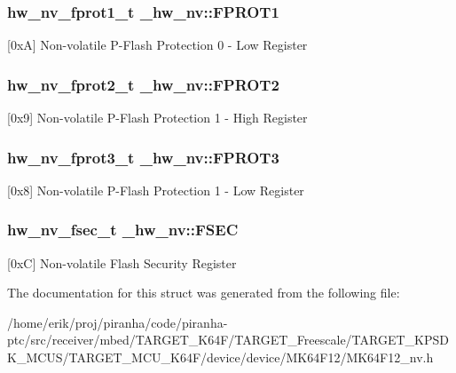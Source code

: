 \subsubsection[{\texorpdfstring{F\+P\+R\+O\+T1}{FPROT1}}]{ {\bf hw\+\_\+nv\+\_\+fprot1\+\_\+t} \+\_\+hw\+\_\+nv\+::\+F\+P\+R\+O\+T1}\hypertarget{struct__hw__nv_a3680dcb78d98d5d3177feafd381081c6}{}\label{struct__hw__nv_a3680dcb78d98d5d3177feafd381081c6}
\mbox{[}0xA\mbox{]} Non-\/volatile P-\/\+Flash Protection 0 -\/ Low Register 
\subsubsection[{\texorpdfstring{F\+P\+R\+O\+T2}{FPROT2}}]{ {\bf hw\+\_\+nv\+\_\+fprot2\+\_\+t} \+\_\+hw\+\_\+nv\+::\+F\+P\+R\+O\+T2}\hypertarget{struct__hw__nv_ad21a9c16923e734ef0df3bc50db9f8f2}{}\label{struct__hw__nv_ad21a9c16923e734ef0df3bc50db9f8f2}
\mbox{[}0x9\mbox{]} Non-\/volatile P-\/\+Flash Protection 1 -\/ High Register 
\subsubsection[{\texorpdfstring{F\+P\+R\+O\+T3}{FPROT3}}]{ {\bf hw\+\_\+nv\+\_\+fprot3\+\_\+t} \+\_\+hw\+\_\+nv\+::\+F\+P\+R\+O\+T3}\hypertarget{struct__hw__nv_aac4b392614cf656aa6df868cfb145360}{}\label{struct__hw__nv_aac4b392614cf656aa6df868cfb145360}
\mbox{[}0x8\mbox{]} Non-\/volatile P-\/\+Flash Protection 1 -\/ Low Register 
\subsubsection[{\texorpdfstring{F\+S\+EC}{FSEC}}]{ {\bf hw\+\_\+nv\+\_\+fsec\+\_\+t} \+\_\+hw\+\_\+nv\+::\+F\+S\+EC}\hypertarget{struct__hw__nv_a25e028222bc59182b5c0d1e035cf9e86}{}\label{struct__hw__nv_a25e028222bc59182b5c0d1e035cf9e86}
\mbox{[}0xC\mbox{]} Non-\/volatile Flash Security Register 

The documentation for this struct was generated from the following file\+:\begin{DoxyCompactItemize}
\item 
/home/erik/proj/piranha/code/piranha-\/ptc/src/receiver/mbed/\+T\+A\+R\+G\+E\+T\+\_\+\+K64\+F/\+T\+A\+R\+G\+E\+T\+\_\+\+Freescale/\+T\+A\+R\+G\+E\+T\+\_\+\+K\+P\+S\+D\+K\+\_\+\+M\+C\+U\+S/\+T\+A\+R\+G\+E\+T\+\_\+\+M\+C\+U\+\_\+\+K64\+F/device/device/\+M\+K64\+F12/M\+K64\+F12\+\_\+nv.\+h\end{DoxyCompactItemize}
